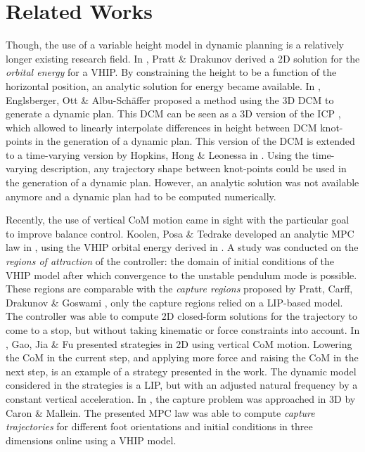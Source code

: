 \section{Related Works}
Though, the use of a variable height model in dynamic planning is a relatively longer existing research field. In \cite{pratt2007derivation}, Pratt \& Drakunov derived a \ac{2D} solution for the \textit{orbital energy} for a \ac{VHIP}. By constraining the height to be a function of the horizontal position, an analytic solution for energy became available. In \cite{englsberger2013three}, Englsberger, Ott \& Albu-Sch{\"a}ffer proposed a method using the \ac{3D} \ac{DCM} to generate a dynamic plan. This \ac{DCM} can be seen as a \ac{3D} version of the \ac{ICP} \cite{koolen2012capturability}, which allowed to linearly interpolate differences in height between \ac{DCM} knot-points in the generation of a dynamic plan.  This version of the \ac{DCM} is extended to a time-varying version by Hopkins, Hong \& Leonessa in \cite{hopkins2014humanoid}. Using the time-varying description, any trajectory shape between knot-points could be used in the generation of a dynamic plan. However, an analytic solution was not available anymore and a dynamic plan had to be computed numerically. 

Recently, the use of vertical \ac{CoM} motion came in sight with the particular goal to improve balance control. Koolen, Posa \& Tedrake developed an analytic \ac{MPC} law in \cite{koolen2016balance}, using the \ac{VHIP} orbital energy derived in \cite{pratt2007derivation}. A study was conducted on the \textit{regions of attraction} of the controller: the domain of initial conditions of the \ac{VHIP} model after which convergence to the unstable pendulum mode is possible. These regions are comparable with the \textit{capture regions} proposed by Pratt, Carff, Drakunov \& Goswami \cite{pratt2006capture}, only the capture regions relied on a \ac{LIP}-based model. The controller was able to compute \ac{2D} closed-form solutions for the trajectory to come to a stop, but without taking kinematic or force constraints into account. In \cite{gao2017increase}, Gao, Jia \& Fu presented strategies in \ac{2D} using vertical \ac{CoM} motion. Lowering the \ac{CoM} in the current step, and applying more force and raising the \ac{CoM} in the next step, is an example of a strategy presented in the work. The dynamic model considered in the strategies is a \ac{LIP}, but with an adjusted natural frequency by a constant vertical acceleration. In \cite{caron2018balance}, the capture problem was approached in \ac{3D} by Caron \& Mallein. The presented \ac{MPC} law was able to compute \textit{capture trajectories} for different foot orientations and initial conditions in three dimensions online using a \ac{VHIP} model.

